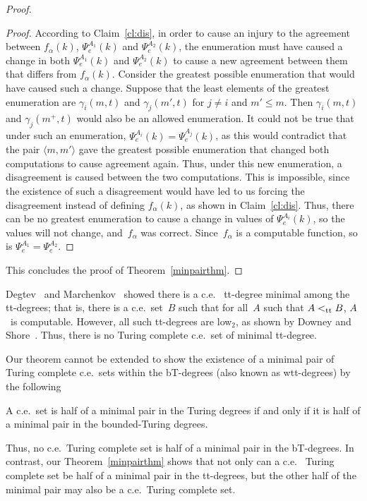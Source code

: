 \documentclass{LMCS}
\newcommand{\0}{\mathbf{0}}
\newcommand{\ce}{c.e.\ }
\newcommand{\<}{\langle}
\renewcommand{\>}{\rangle}
\begin{document}
\begin{proof}
\begin{proof}
According to Claim~\ref{cl:dis}, in order to cause an injury to the agreement
between $f_\alpha(k)$, $\Psi_e^{A_1}(k)$ and $\Psi_e^{A_2}(k)$, the
enumeration must have caused a change in both $\Psi_e^{A_1}(k)$ and
$\Psi_e^{A_2}(k)$ to cause a new agreement between them that differs from
$f_\alpha(k)$.  Consider the greatest possible enumeration that would have
caused such a change. Suppose that the least elements of the greatest
enumeration are $\gamma_i(m,t)$ and $\gamma_j(m', t)$ for $j\neq i$ and
$m'\leq m$.  Then $\gamma_i(m,t)$ and $\gamma_j(m^+, t)$ would also be an
allowed enumeration. It could not be true that under such an enumeration,
$\Psi_e^{A_i}(k)=\Psi_e^{A_j}(k)$, as this would contradict that the pair
$\langle m,m'\rangle$ gave the greatest possible enumeration that changed
both computations to cause agreement again.  Thus, under this new
enumeration, a disagreement is caused between the two computations.  This is
impossible, since the existence of such a disagreement would have led to us
forcing the disagreement instead of defining $f_\alpha(k)$, as shown in
Claim~\ref{cl:dis}.  Thus, there can be no greatest enumeration to cause a
change in values of $\Psi_e^{A_i}(k)$, so the values will not change,
and~$f_\alpha$ was correct.  Since~$f_\alpha$ is a computable function, so is
$\Psi_e^{A_1}=\Psi_e^{A_2}$.
\end{proof}

This concludes the proof of Theorem~\ref{minpairthm}.
\end{proof}

Degtev~\cite{Degtev} and Marchenkov~\cite{Marchenkov} showed there is a \ce
tt-degree minimal among the tt-degrees; that is, there is a \ce set~$B$ such
that for all~$A$ such that $A<_{\rm tt} B$, $A$~is computable.  However, all
such tt-degrees are low$_2$, as shown by Downey and Shore~\cite{DS}. Thus,
there is no Turing complete \ce set of minimal tt-degree.

Our theorem cannot be extended to show the existence of a minimal pair of
Turing complete \ce sets within the bT-degrees (also known as wtt-degrees) by
the following

\begin{thm}
A \ce set is half of a minimal pair in the Turing degrees if and only if it
is half of a minimal pair in the bounded-Turing degrees.
\end{thm}

Thus, no \ce Turing complete set is half of a minimal pair in the bT-degrees.
In contrast, our Theorem~\ref{minpairthm} shows that not only can a \ce
Turing complete set be half of a minimal pair in the tt-degrees, but the
other half of the minimal pair may also be a \ce Turing complete set.
\end{document}
